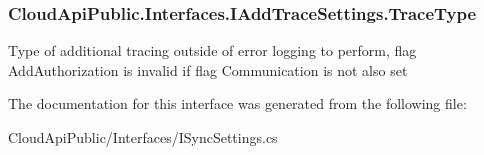 \hypertarget{interface_cloud_api_public_1_1_interfaces_1_1_i_add_trace_settings_ac48528e64d5cf0ffce04bc93463d138e}{
\subsubsection[{Trace\-Type}]{ Cloud\-Api\-Public.\-Interfaces.\-I\-Add\-Trace\-Settings.\-Trace\-Type\hspace{0.3cm}{\ttfamily [get]}}}\label{interface_cloud_api_public_1_1_interfaces_1_1_i_add_trace_settings_ac48528e64d5cf0ffce04bc93463d138e}


Type of additional tracing outside of error logging to perform, flag Add\-Authorization is invalid if flag Communication is not also set 



The documentation for this interface was generated from the following file\-:\begin{DoxyCompactItemize}
\item 
Cloud\-Api\-Public/\-Interfaces/I\-Sync\-Settings.\-cs\end{DoxyCompactItemize}
